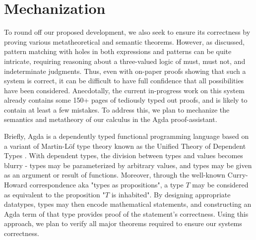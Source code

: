 \section{Mechanization}\label{sec:mechanization}
To round off our proposed development, we also seek to ensure its correctness by proving various metatheoretical and semantic theorems. However, as discussed, pattern matching with holes in both expressions and patterns can be quite intricate, requiring reasoning about a three-valued logic of must, must not, and indeterminate judgments. Thus, even with on-paper proofs showing that such a system is correct, it can be difficult to have full confidence that all possibilities have been considered. Anecdotally, the current in-progress work on this system already contains some 150+ pages of tediously typed out proofs, and is likely to contain at least a few mistakes. To address this, we plan to mechanize the semantics and metatheory of our calculus in the Agda proof-assistant.

Briefly, Agda is a dependently typed functional programming language based on a variant of Martin-L\"of type theory known as the Unified Theory of Dependent Types \cite{DBLP:books/daglib/0078470, norell:thesis}. With dependent types, the division between types and values becomes blurry - types may be parameterized by arbitrary values, and types may be given as an argument or result of functions. Moreover, through the well-known Curry-Howard correspondence aka "types as propositions", a type $T$ may be considered as equivalent to the proposition "$T$ is inhabited". By designing appropriate datatypes, types may then encode mathematical statements, and constructing an Agda term of that type provides proof of the statement's correctness. Using this approach, we plan to verify all major theorems required to ensure our systems correctness.